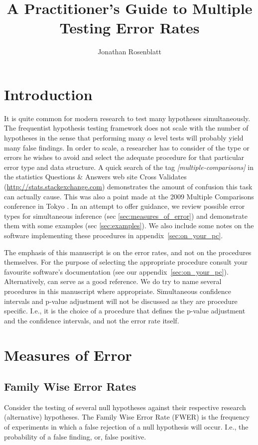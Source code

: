 \documentclass[review,12pt]{article}
\title{A Practitioner's Guide to Multiple Testing Error Rates}
\author{Jonathan Rosenblatt}
\date{}
\begin{document}
\maketitle


\section{Introduction}

It is quite common for modern research to test many hypotheses simultaneously. The frequentist hypothesis testing framework does not scale with the number of hypotheses in the sense that performing many $\alpha$ level tests will probably yield many false findings. In order to scale, a researcher has to consider of the type or errors he wishes to avoid and select the adequate procedure for that particular error type and data structure. A quick search of the tag \emph{[multiple-comparisons]} in the statistics Questions \& Answers web site Cross Validates (\url{http://stats.stackexchange.com}) demonstrates the amount of confusion this task can actually cause. This was also a point made at the 2009 Multiple Comparisons conference in Tokyo \citep[][section 4.4]{benjamini_simultaneous_2010}. 
In an attempt to offer guidance, we review possible error types for simultaneous inference (sec \ref{sec:measures_of_error}) and demonstrate them with some examples (sec \ref{sec:examples}). We also include some notes on the software implementing these procedures in appendix~\ref{sec:on_your_pc}.

The emphasis of this manuscript is on the error rates, and not on the procedures themselves. For the purpose of selecting the appropriate procedure consult your favourite software's documentation (see our appendix~\ref{sec:on_your_pc}). Alternatively, \citet{farcomeni_review_2008} can serve as a good reference. 
We do try to name several procedures in this manuscript where appropriate.  Simultaneous confidence intervals and p-value adjustment will not be discussed as they are procedure specific. I.e., it is the choice of a procedure that defines the p-value adjustment and the confidence intervals, and not the error rate itself.


\section{\label{sec:measures_of_error}Measures of Error}

\subsection{Family Wise Error Rates}
Consider the testing of several null hypotheses against their respective research (alternative) hypotheses. The Family Wise Error Rate (FWER) is the frequency of experiments in which a false rejection of a null hypothesis will occur. I.e., the probability of a false finding, or, false positive.
\end{document}
